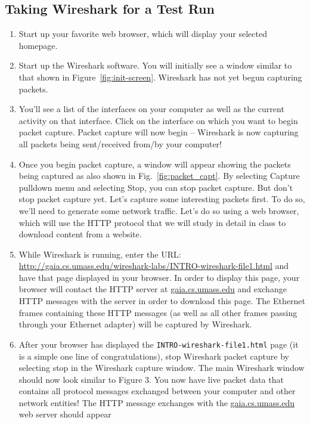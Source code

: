 \documentclass[11pt,a4paper]{article}
\begin{document}
\subsection{Taking Wireshark for a Test Run}

\begin{enumerate}
    \item Start up your favorite web browser, which will display your selected homepage.
    \item Start up the Wireshark software. You will initially see a window similar to that
    shown in Figure~\ref{fig:init-screen}. Wireshark has not yet begun capturing packets.
    \item You’ll see a list of the interfaces on your computer as well as the current activity on that interface. Click on the
    interface on which you want to begin packet capture. Packet capture will now begin -- Wireshark is now
    capturing all packets being sent/received from/by your computer!
    \item Once you begin packet capture, a window will
    appear showing the packets being captured as also shown in Fig.~\ref{fig:packet_capt}. By selecting Capture
    pulldown menu and selecting Stop, you can stop packet capture. But don’t stop
    packet capture yet. 
    Let's capture some interesting packets first. To do so, we'll
    need to generate some network traffic. Let’s do so using a web browser, which
    will use the HTTP protocol that we will study in detail in class to download
    content from a website.
    \item While Wireshark is running, enter the URL:
    \url{http://gaia.cs.umass.edu/wireshark-labs/INTRO-wireshark-file1.html}
    and have that page displayed in your browser. In order to display this page, your
    browser will contact the HTTP server at \url{gaia.cs.umass.edu} and exchange HTTP
    messages with the server in order to download this page. The Ethernet frames containing these HTTP messages (as well as all other frames passing through your Ethernet adapter) will be captured by Wireshark.
    \item After your browser has displayed the \texttt{INTRO-wireshark-file1.html} page (it is a
    simple one line of congratulations), stop Wireshark packet capture by selecting
    stop in the Wireshark capture window. The main Wireshark window should now
    look similar to Figure 3. You now have live packet data that contains all protocol
    messages exchanged between your computer and other network entities! The
    HTTP message exchanges with the \url{gaia.cs.umass.edu} web server should appear

\end{enumerate}
\end{document}
